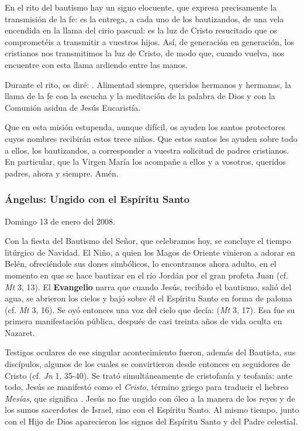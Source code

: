 {En el rito del bautismo hay un signo elocuente, que expresa precisamente la transmisión de la fe: es la entrega, a cada uno de los bautizandos, de una vela encendida en la llama del cirio pascual: es la luz de Cristo resucitado que os comprometéis a transmitir a vuestros hijos. Así, de generación en generación, los cristianos nos transmitimos la luz de Cristo, de modo que, cuando vuelva, nos encuentre con esta llama ardiendo entre las manos.

Durante el rito, os diré: . Alimentad siempre, queridos hermanos y hermanas, la llama de la fe con la escucha y la meditación de la palabra de Dios y con la Comunión asidua de Jesús Eucaristía.

Que en esta misión estupenda, aunque difícil, os ayuden los santos protectores cuyos nombres recibirán estos trece niños. Que estos santos les ayuden sobre todo a ellos, los bautizandos, a corresponder a vuestra solicitud de padres cristianos. En particular, que la Virgen María los acompañe a ellos y a vosotros, queridos padres, ahora y siempre. Amén.

\subsubsection{Ángelus: Ungido con el Espíritu Santo}

Domingo 13 de enero del 2008.

Con la fiesta del Bautismo del Señor, que celebramos hoy, se concluye el tiempo litúrgico de Navidad. El Niño, a quien los Magos de Oriente vinieron a adorar en Belén, ofreciéndole sus dones simbólicos, lo encontramos ahora adulto, en el momento en que se hace bautizar en el río Jordán por el gran profeta Juan (cf. \emph{Mt} 3, 13). El \textbf{Evangelio} narra que cuando Jesús, recibido el bautismo, salió del agua, se abrieron los cielos y bajó sobre él el Espíritu Santo en forma de paloma (cf. \emph{Mt} 3, 16). Se oyó entonces una voz del cielo que decía:  (\emph{Mt} 3, 17). Esa fue su primera manifestación pública, después de casi treinta años de vida oculta en Nazaret.

Testigos oculares de ese singular acontecimiento fueron, además del Bautista, sus discípulos, algunos de los cuales se convirtieron desde entonces en seguidores de Cristo (cf. \emph{Jn} 1, 35-40). Se trató simultáneamente de cristofanía y teofanía: ante todo, Jesús se manifestó como el \emph{Cristo}, término griego para traducir el hebreo \emph{Mesías}, que significa . Jesús no fue ungido con óleo a la manera de los reyes y de los sumos sacerdotes de Israel, sino con el Espíritu Santo. Al mismo tiempo, junto con el Hijo de Dios aparecieron los signos del Espíritu Santo y del Padre celestial.

}
